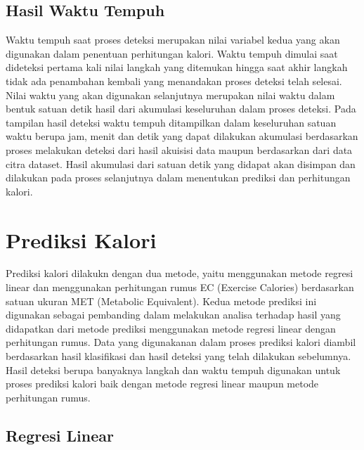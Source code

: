 \subsection{Hasil Waktu Tempuh}
\label{subsec:HasilWaktu}

Waktu tempuh saat proses deteksi merupakan nilai variabel kedua yang akan digunakan dalam penentuan perhitungan kalori. Waktu tempuh dimulai saat dideteksi pertama kali nilai langkah yang ditemukan hingga saat akhir langkah tidak ada penambahan kembali yang menandakan proses deteksi telah selesai. Nilai waktu yang akan digunakan selanjutnya merupakan nilai waktu dalam bentuk satuan detik hasil dari akumulasi keseluruhan dalam proses deteksi. Pada tampilan hasil deteksi waktu tempuh ditampilkan dalam keseluruhan satuan waktu berupa jam, menit dan detik yang dapat dilakukan akumulasi berdasarkan proses melakukan deteksi dari hasil akuisisi data maupun berdasarkan dari data citra dataset. Hasil akumulasi dari satuan detik yang didapat akan disimpan dan dilakukan pada proses selanjutnya dalam menentukan prediksi dan perhitungan kalori.

\section{Prediksi Kalori}
\label{sec:PrediksiKalori}

Prediksi kalori dilakukn dengan dua metode, yaitu menggunakan metode regresi linear dan menggunakan perhitungan rumus EC (Exercise Calories) berdasarkan satuan ukuran MET (Metabolic Equivalent). Kedua metode prediksi ini digunakan sebagai pembanding dalam melakukan analisa terhadap hasil yang didapatkan dari metode prediksi menggunakan metode regresi linear dengan perhitungan rumus. Data yang digunakanan dalam proses prediksi kalori diambil berdasarkan hasil klasifikasi dan hasil deteksi yang telah dilakukan sebelumnya. Hasil deteksi berupa banyaknya langkah dan waktu tempuh digunakan untuk proses prediksi kalori baik dengan metode regresi linear maupun metode perhitungan rumus.

\subsection{Regresi Linear}
\label{subsec:PrediksiRegresi}

